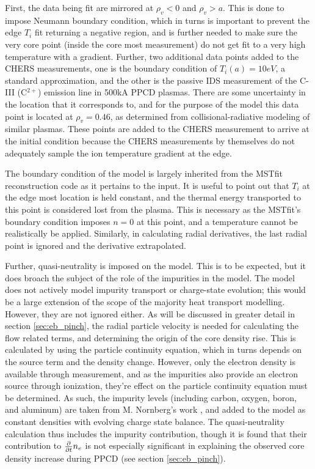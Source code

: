First, the data being fit are mirrored at $\rho_v < 0$ and $\rho_v > a$. This is done to impose Neumann boundary condition, which in turns is important to prevent the edge $T_i$ fit returning a negative region, and is further needed to make sure the very core point (inside the core most measurement) do not get fit to a very high temperature with a gradient. Further, two additional data points added to the CHERS measurements, one is the boundary condition of $T_i(a) = 10eV$, a standard approximation, and the other is the passive IDS measurement of the C-III (C$^{2+}$) emission line in 500kA PPCD plasmas. There are some uncertainty in the location that it corresponds to, and for the purpose of the model this data point is located at $\rho_v = 0.46$, as determined from collisional-radiative modeling of similar plasmas\cite{Nishizawa2018,Barbui2014}. These points are added to the CHERS measurement to arrive at the initial condition because the CHERS measurements by themselves do not adequately sample the ion temperature gradient at the edge.

The boundary condition of the model is largely inherited from the MSTfit reconstruction code \cite{AndersonThesis} as it pertains to the input. It is useful to point out that $T_i$ at the edge most location is held constant, and the thermal energy transported to this point is considered lost from the plasma. This is necessary as the MSTfit's boundary condition imposes $n = 0$ at this point, and a temperature cannot be realistically be applied. Similarly, in calculating radial derivatives, the last radial point is ignored and the derivative extrapolated.

Further, quasi-neutrality is imposed on the model. This is to be expected, but it does broach the subject of the role of the impurities in the model. The model does not actively model impurity transport or charge-state evolution; this would be a large extension of the scope of the majority heat transport modelling. However, they are not ignored either. As will be discussed in greater detail in section \ref{sec:eb_pinch}, the radial particle velocity is needed for calculating the flow related terms, and determining the origin of the core density rise. This is calculated by using the particle continuity equation, which in turns depends on the source term and the density change. However, only the electron density is available through measurement, and as the impurities also provide an electron source through ionization, they're effect on the particle continuity equation must be determined. As such, the impurity levels (including carbon, oxygen, boron, and aluminum) are taken from M. Nornberg's work \cite{Nornberg2018}, and added to the model as constant densities with evolving charge state balance. The quasi-neutrality calculation thus includes the impurity contribution, though it is found that their contribution to $\frac{\partial}{\partial t} n_e$ is not especially significant in explaining the observed core density increase during PPCD (see section \ref{sec:eb_pinch}).

